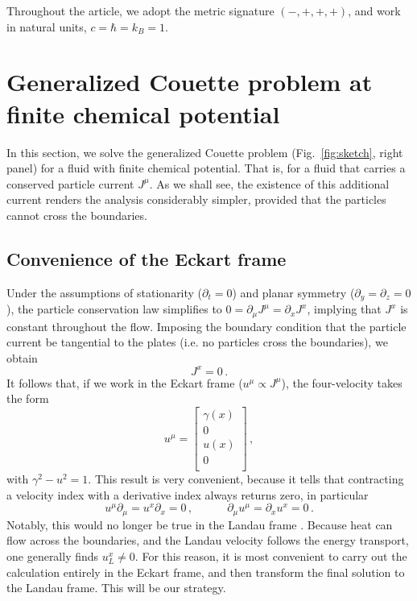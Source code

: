 \documentclass[a4paper, amsfonts, amssymb, amsmath, reprint, showkeys, nofootinbib, twoside,notitlepage,onecolumn]{revtex4-1}
\newcommand{\spc}{\quad \quad \quad}
\theoremstyle{definition}
\theoremstyle{theorem}
\begin{document}
Throughout the article, we adopt the metric signature $(-,+,+,+)$, and work in natural units, $c=\hbar=k_B=1$.

\vspace{-0.2cm}
\section{Generalized Couette problem at finite chemical potential}\label{finitUdine}
\vspace{-0.2cm}

In this section, we solve the generalized Couette problem (Fig.~\ref{fig:sketch}, right panel) for a fluid with finite chemical potential. That is, for a fluid that carries a conserved particle current $J^\mu$. As we shall see, the existence of this additional current renders the analysis considerably simpler, provided that the particles cannot cross the boundaries.

\vspace{-0.2cm}
\subsection{Convenience of the Eckart frame}\label{Eckartiamo!}
\vspace{-0.2cm}

Under the assumptions of stationarity ($\partial_t = 0$) and planar symmetry ($\partial_y = \partial_z = 0$), the particle conservation law simplifies to  $0 = \partial_\mu J^\mu = \partial_x J^x$,  
implying that $J^x$ is constant throughout the flow. Imposing the boundary condition that the particle current be tangential to the plates (i.e. no particles cross the boundaries), we obtain
\begin{equation}\label{Jxxxx}
J^x = 0 \, . 
\end{equation}  
It follows that, if we work in the Eckart frame ($u^\mu \propto J^\mu$), the four-velocity takes the form
\begin{equation}
u^\mu =
\begin{bmatrix}
\gamma(x)\\
0\\
u(x)\\
0 \\
\end{bmatrix} \, ,
\end{equation}
with $\gamma^2-u^2=1$. This result is very convenient, because it tells that contracting a velocity index with a derivative index always returns zero, in particular
\begin{equation}\label{dxuxiszero}
u^\mu \partial_\mu =u^x \partial_x =0 \, , \spc \partial_\mu u^\mu =\partial_x u^x=0  \, .
\end{equation}
Notably, this would no longer be true in the Landau frame \cite{landau6}. Because heat can flow across the boundaries, and the Landau velocity follows the energy transport, one generally finds $u_L^x \neq 0$. For this reason, it is most convenient to carry out the calculation entirely in the Eckart frame, and then transform the final solution to the Landau frame. This will be our strategy.
\end{document}
